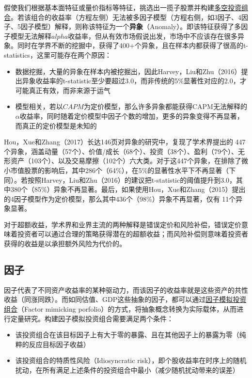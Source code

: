 \documentclass[11pt]{article}
\begin{document}
假使我们根据基本面特征或量价指标等特征，挑选出一揽子股票并构建\uline{多空投资组合}。若该组合的收益率（方程左侧）无法被多因子模型（方程右侧，如3因子、4因子、5因子模型）解释，则称该特征为一个\textbf{异象}（Anomaly）。即该特征获得了多因子模型无法解释$alpha$收益率，但从有效市场假说出发，市场中不应该存在很多异象。同时在学界不断的挖掘中，获得了400+个异象，且在样本内都获得了很高的t-statistics，这里可能存在两个原因：
\begin{itemize}
    \item 数据挖掘，大量的异象在样本内被挖掘出，因此Harvey，Liu和Zhu（2016）提出异象收益率的t-statistic至少要超过3.0，而非传统的5\%显著性对应的2.0，才可能真正有效，而非来源于运气
    \item 模型相关，若以$CAPM$为定价模型，那么许多异象都能获得CAPM无法解释的$\alpha$收益率，同时随着定价模型中因子个数的增加，更多的异象变得不再显著，而真正的定价模型是未知的
\end{itemize}

Hou，Xue和Zhang（2017）长达146页对异象的研究中，复现了学术界提出的 447 个异象，涵盖动量（57个）、价值/成长（68个）、投资（38个）、盈利（79个）、无形资产（103个）、以及交易摩擦（102个）六大类。对于这447个异象，在排除了微小市值股票的影响后，其中286个（64\%），在5\%的显著性水平下不再显著（下同）。若按照Harvey，Liu和Zhu（2016）的建议把t-statistic的阈值提升到3.0，其中380个（85\%）异象不再显著。最后，如果使用Hou，Xue和Zhang（2015）提出的4因子模型作为定价模型，那么其中436个（98\%）异象不再显著，仅有 11个异象显著。

对于超额收益，学术界和业界主流的两种解释是错误定价和风险补偿，错误定价意味着投资者可以通过合理的策略获得潜在的超额收益；而风险补偿则意味着投资者获得的收益是以承担额外风险为代价的。

\subsection{因子}

因子代表了不同资产收益率的某种驱动力，而该因子的收益率就是这些资产的共性收益（同涨同跌）。而如同估值、GDP这些抽象的因子，都可以通过\uline{因子模拟投资组合}（Factor mimicking porfolio）的方式，将抽象概念转换为实际载体，从而进行定量研究。构建因子模拟投资组合需要满足两个条件：
\begin{itemize}
    \item 该投资组合在该目标因子上有大于零的暴露、且在其他因子上的暴露为零（纯粹的反应目标因子收益）
    \item 该投资组合的特质性风险（Idiosyncratic risk），即个股收益率在时序上的随机扰动，在所有满足上述条件的投资组合中最小（减少随机扰动带来的误差）
\end{itemize}
\end{document}

